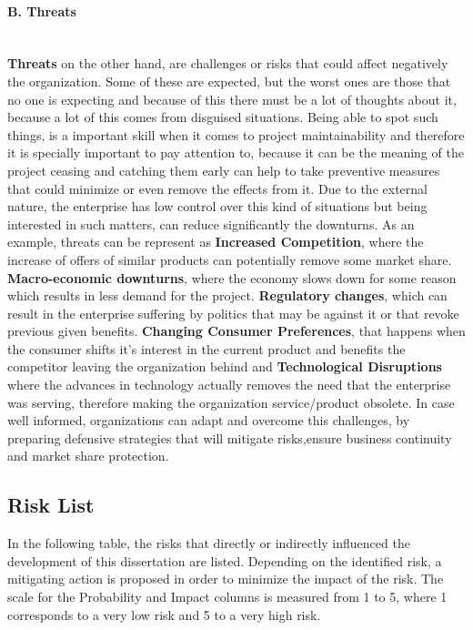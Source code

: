\paragraph{B. Threats}\mbox{}\\
\textbf{Threats} on the other hand, are challenges or risks that could affect negatively the organization. Some of these are expected, but 
the worst ones are those that no one is expecting and because of this there must be a lot of thoughts about it, because a lot of this comes 
from disguised situations. Being able to spot such things, is a important skill when it comes to project maintainability and therefore it 
is specially important to pay attention to, because it can be the meaning of the project ceasing and catching them early can help to take 
preventive measures that could minimize or even remove the effects from it. Due to the external nature, the enterprise has low control over 
this kind of situations but being interested in such matters, can reduce significantly the downturns.
As an example, threats can be represent as \textbf{Increased Competition}, where the increase of offers of similar products can 
potentially remove some market share. \textbf{Macro-economic downturns}, where the economy slows down for some reason which results in 
less demand for the project. \textbf{Regulatory changes}, which can result in the enterprise suffering by politics that may be against it 
or that revoke previous given benefits. \textbf{Changing Consumer Preferences}, that happens when the consumer shifts it's interest in the 
current product and benefits the competitor leaving the organization behind and \textbf{Technological Disruptions} where the advances in 
technology actually removes the need that the enterprise was serving, therefore making the organization service/product obsolete.
In case well informed, organizations can adapt and overcome this challenges, by preparing defensive strategies that will mitigate 
risks,ensure business continuity and market share protection.

\subsection{Risk List}

In the following table, the risks that directly or indirectly influenced the development of this dissertation are listed. Depending 
on the identified risk, a mitigating action is proposed in order to minimize the impact of the risk. The scale for the Probability and 
Impact columns is measured from 1 to 5, where 1 corresponds to a very low risk and 5 to a very high risk.

